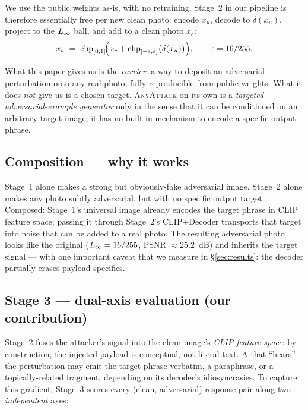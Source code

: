 We use the public weights as-is, with no retraining. Stage~2 in our pipeline is therefore essentially free per new clean photo: encode $x_u$, decode to $\delta(x_u)$, project to the $L_{\infty}$ ball, and add to a clean photo $x_c$:
\begin{equation}
  x_a \;=\; \mathrm{clip}_{[0,1]}\!\Bigl(x_c + \mathrm{clip}_{[-\varepsilon,\varepsilon]}\bigl(\delta(x_u)\bigr)\Bigr), \qquad \varepsilon = 16/255.
\end{equation}

What this paper gives us is the \emph{carrier}: a way to deposit an adversarial perturbation onto any real photo, fully reproducible from public weights. What it does \emph{not} give us is a chosen target. \textsc{AnyAttack} on its own is a \emph{targeted-adversarial-example generator} only in the sense that it can be conditioned on an arbitrary target image; it has no built-in mechanism to encode a specific output phrase.

\subsection{Composition --- why it works}

Stage~1 alone makes a strong but obviously-fake adversarial image. Stage~2 alone makes any photo subtly adversarial, but with no specific output target. Composed: Stage~1's universal image already encodes the target phrase in CLIP feature space; passing it through Stage~2's CLIP+Decoder transports that target into noise that can be added to a real photo. The resulting adversarial photo looks like the original ($L_{\infty} = 16/255$, PSNR $\approx 25.2$~dB) and inherits the target signal --- with one important caveat that we measure in \S\ref{sec:results}: the decoder partially erases payload specifics.

\subsection{Stage 3 --- dual-axis evaluation (our contribution)}
\label{sec:method-stage3}

Stage~2 fuses the attacker's signal into the clean image's \emph{CLIP feature space}: by construction, the injected payload is conceptual, not literal text. A \vlm{} that ``hears'' the perturbation may emit the target phrase verbatim, a paraphrase, or a topically-related fragment, depending on its decoder's idiosyncrasies. To capture this gradient, Stage~3 scores every (clean, adversarial) response pair along two \emph{independent} axes:

